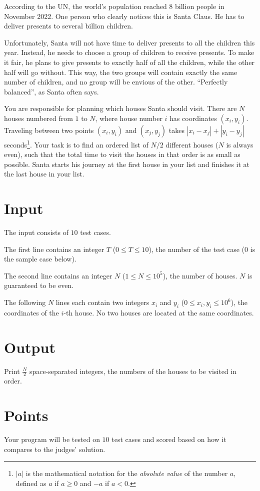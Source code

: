 According to the UN, the world's population reached 8 billion people in November 2022. One person who clearly
notices this is Santa Claus. He has to deliver presents to several billion children.

Unfortunately, Santa will not have time to deliver presents to all the children this year. Instead, he needs
to choose a group of children to receive presents. To make it fair, he plans to give presents to exactly half
of all the children, while the other half will go without. This way, the two groups will contain exactly the
same number of children, and no group will be envious of the other. ``Perfectly balanced'', as Santa often says.

You are responsible for planning which houses Santa should visit. There are $N$ houses numbered from $1$ to $N$,
where house number $i$ has coordinates $(x_i, y_i)$. Traveling between two points $(x_i, y_i)$ and $(x_j, y_j)$
takes $|x_i - x_j| + |y_i - y_j|$ seconds\footnote{$|a|$ is the mathematical notation for the \emph{absolute value}
of the number $a$, defined as $a$ if $a \ge 0$ and $-a$ if $a < 0$.}.
Your task is to find an ordered list of $N/2$ different houses ($N$ is always even), such that the total time to
visit the houses in that order is as small as possible. Santa starts his journey at the first house in your list
and finishes it at the last house in your list.

\section*{Input}
The input consists of $10$ test cases.

The first line contains an integer $T$ ($0 \leq T \leq 10$), the number of the test case ($0$ is the sample case below).

The second line contains an integer $N$ ($1 \leq N \leq 10^5$), the number of houses. $N$ is guaranteed to be even.

The following $N$ lines each contain two integers $x_i$ and $y_i$ ($0 \leq x_i, y_i \leq 10^6$), the coordinates of the
$i$-th house. No two houses are located at the same coordinates.

\section*{Output}
Print $\frac{N}{2}$ space-separated integers, the numbers of the houses to be visited in order.

\section*{Points}
Your program will be tested on $10$ test cases and scored based on how it compares to the judges' solution.

